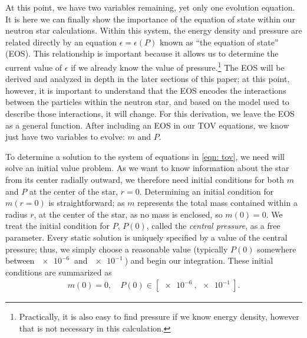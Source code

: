 
At this point, we have two variables remaining, yet only one evolution equation. It is here we can finally show the importance of the equation of state within our neutron star calculations. Within this system, the energy density and pressure are related directly by an equation $\epsilon = \epsilon(P)$ known as ``the equation of state'' (EOS). This relationship is important because it allows us to determine the current value of $\epsilon$ if we already know the value of pressure.\footnote{ Practically, it is also easy to find pressure if we know energy density, however that is not necessary in this calculation.} The EOS will be derived and analyzed in depth in the later sections of this paper; at this point, however, it is important to understand that the EOS encodes the interactions between the particles within the neutron star, and based on the model used to describe those interactions, it will change. For this derivation, we leave the EOS as a general function. After including an EOS in our TOV equations, we know just have two variables to evolve: $m$ and $P$.


To determine a solution to the system of equations in \eqref{eqn: tov}, we need will solve an initial value problem. As we want to know information about the star from its center radially outward, we therefore need initial conditions for both $m$ and $P$ at the center of the star, $r=0$. Determining an initial condition for $m(r=0)$ is straightforward; as $m$ represents the total mass contained within a radius $r$, at the center of the star, as no mass is enclosed, so $m(0)=0$. We treat the initial condition for $P$, $P(0)$, called the \textit{central pressure}, as a free parameter. Every static solution is uniquely specified by a value of the central pressure; thus, we simply choose a reasonable value (typically $P(0)$ somewhere between $\SI{e-6}{}$ and $\SI{e-1}{}$) and begin our integration. These initial conditions are summarized as
\begin{align}
    m(0) = 0, \quad P(0) \in [\SI{e-6}{}, \SI{e-1}{}].
\end{align}

